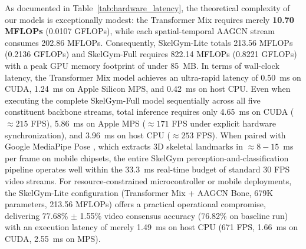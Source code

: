 \documentclass[runningheads]{llncs}
\begin{document}
As documented in Table~\ref{tab:hardware_latency}, the theoretical complexity of our models is exceptionally modest: the Transformer Mix requires merely \textbf{10.70 MFLOPs} (0.0107 GFLOPs), while each spatial-temporal AAGCN stream consumes 202.86 MFLOPs. Consequently, SkelGym-Lite totals 213.56 MFLOPs (0.2136 GFLOPs) and SkelGym-Full requires 822.14 MFLOPs (0.8221 GFLOPs) with a peak GPU memory footprint of under 85~MB.
In terms of wall-clock latency, the Transformer Mix model achieves an ultra-rapid latency of 0.50~ms on CUDA, 1.24~ms on Apple Silicon MPS, and 0.42~ms on host CPU. Even when executing the complete SkelGym-Full model sequentially across all five constituent backbone streams, total inference requires only 4.65~ms on CUDA ($\approx 215$ FPS), 5.86~ms on Apple MPS ($\approx 171$ FPS under explicit hardware synchronization), and 3.96~ms on host CPU ($\approx 253$ FPS). When paired with Google MediaPipe Pose \cite{chuankun2019,bazarevsky2020}, which extracts 3D skeletal landmarks in $\approx 8-15$~ms per frame on mobile chipsets, the entire SkelGym perception-and-classification pipeline operates well within the 33.3~ms real-time budget of standard 30 FPS video streams. For resource-constrained microcontroller or mobile deployments, the SkelGym-Lite configuration (Transformer Mix + AAGCN Bone, 679K parameters, 213.56 MFLOPs) offers a practical operational compromise, delivering 77.68\% $\pm$ 1.55\% video consensus accuracy (76.82\% on baseline run) with an execution latency of merely 1.49~ms on host CPU (671 FPS, 1.66~ms on CUDA, 2.55~ms on MPS).
\end{document}
